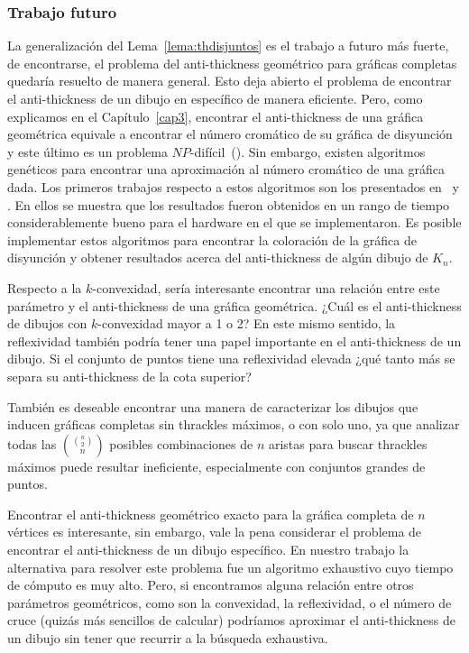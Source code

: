 \subsubsection{Trabajo futuro}

La generalización del Lema~\ref{lema:thdisjuntos} es el trabajo a futuro más fuerte, de encontrarse, el
problema del anti-thickness geométrico para gráficas completas quedaría resuelto de manera general. Esto
deja abierto el problema de encontrar el anti-thickness de un dibujo en específico de manera eficiente.
Pero, como explicamos en el Capítulo~\ref{cap3}, encontrar el anti-thickness de una gráfica geométrica
equivale a encontrar el número cromático de su gráfica de disyunción y este último es un problema
$NP$-difícil~(\cite{Skiena2003}). Sin embargo, existen algoritmos genéticos para encontrar una aproximación
al número cromático de una gráfica dada. Los primeros trabajos respecto a estos algoritmos son los
presentados en~\cite{Fleurent1996} y \cite{Galinier1999}. En ellos se muestra que los resultados fueron
obtenidos en un rango de tiempo considerablemente bueno para el hardware en el que se implementaron. Es
posible implementar estos algoritmos para encontrar la coloración de la gráfica de disyunción y obtener
resultados acerca del anti-thickness de algún dibujo de $K_n$.

Respecto a la $k$-convexidad, sería interesante encontrar una relación entre este parámetro y el
anti-thickness de una gráfica geométrica. ¿Cuál es el anti-thickness de dibujos con $k$-convexidad mayor a
1 o 2? En este mismo sentido, la reflexividad también podría tener una papel importante en el
anti-thickness de un dibujo. Si el conjunto de puntos tiene una reflexividad elevada ¿qué tanto más se
separa su anti-thickness de la cota superior?

También es deseable encontrar una manera de caracterizar los dibujos que inducen gráficas completas sin
thrackles máximos, o con solo uno, ya que analizar todas las $\displaystyle \binom{\binom{n}{2}}{n}$
posibles combinaciones de $n$ aristas para buscar thrackles máximos puede resultar ineficiente,
especialmente con conjuntos grandes de puntos.

Encontrar el anti-thickness geométrico exacto para la gráfica completa de $n$ vértices es interesante, sin
embargo, vale la pena considerar el problema de encontrar el anti-thickness de un dibujo específico. En
nuestro trabajo la alternativa para resolver este problema fue un algoritmo exhaustivo cuyo tiempo de
cómputo es muy alto. Pero, si encontramos alguna relación entre otros parámetros geométricos, como
son la convexidad, la reflexividad, o el número de cruce (quizás más sencillos de calcular) podríamos
aproximar el anti-thickness de un dibujo sin tener que recurrir a la búsqueda exhaustiva.
